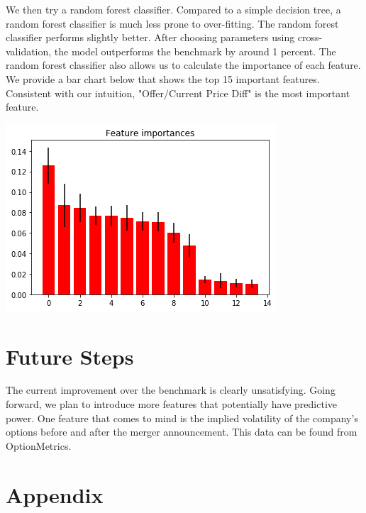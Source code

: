 \documentclass[a4paper]{article}
\begin{document}
We then try a random forest classifier. Compared to a simple decision tree, a random forest classifier is much less prone to over-fitting. The random forest classifier performs slightly better. After choosing parameters using cross-validation, the model outperforms the benchmark by around 1 percent.  The random forest classifier also allows us to calculate the importance of each feature. We provide a bar chart below that shows the top 15 important features. Consistent with our intuition, "Offer/Current Price Diff" is the most important feature. 

\begin{center}
\includegraphics[scale=0.5]{Feature_Importance.png} 

\end{center}


\section{Future Steps }
\label{sec:future}

The current improvement over the benchmark is clearly unsatisfying. Going forward, we plan to introduce more features that potentially have predictive power. One feature that comes to mind is the implied volatility of the company's options before and after the merger announcement. This data can be found from OptionMetrics.


\section{Appendix }
\label{sec:tables}
\end{document}
